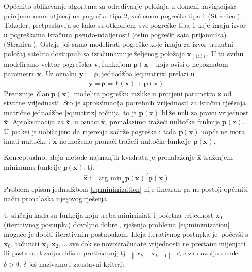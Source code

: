 \documentclass[a4paper,twoside,12pt]{memoir} %
\begin{document}
Općenito oblikovanje algoritma za određivanje položaja u domeni navigacijske primjene nema utjecaj na
pogreške tipa 2,
već samo pogreške tipa 1 (Stranica \pageref{stranica:greskaOvisisamoOxOpravdano}).
Također, pretpostavlja se kako su otklonjene sve pogreške tipa 1 koje imaju izvor 
u pogreškama izračuna pseudo-udaljenosti (osim pogreški sata prijamnika) (Stranica \pageref{stranica:greskaOvisisamoOxOpravdano}).
Ostaje još samo modelirati pogreške koje imaju za izvor trenutni položaj satelita dostupnih za
izračunavanje željenog položaja $\bar{\mathbf{x}}_{(1:3)}$.
U tu svrhu modeliramo vektor pogrešaka $\mathbf{v}$, funkcijom $\mathbf{p}(\mathbf{x})$ koja ovisi o nepoznatom parametru $\mathbf{x}$.
Uz oznaku $\mathbf{y} := \mathbf{\rho}$, 
 jednadžba  \ref{eq:matrix} prelazi u
\begin{align}\label{eq:matrix2}
\mathbf{y} = \mathbf{\rho} = \mathbf{h}(\mathbf{x})+ \mathbf{p}(\mathbf{x})
\end{align}%
Preciznije,
član $\mathbf{p}(\mathbf{x})$ modelira pogrešku razlike u procjeni parametra $\mathbf{x}$ od stvarne vrijednosti.
Što je aproksimacija potrebnih vrijednosti za izračun rješenja matrične jednadžbe
\ref{eq:matrix} točnija, to je $\mathbf{p}(\mathbf{x})$ 
bliže nuli za pravu vrijednost $\bar{\mathbf{x}}$.
Aproksimaciju za $\bar{\mathbf{x}}$, u oznaci $\hat{\mathbf{x}}$, pronalazimo tražeći nultočke funkcije $\mathbf{p}(\mathbf{x})$.
U praksi je uobičajeno da mjerenja sadrže pogreške i tada $\mathbf{p}(\mathbf{x})$ uopće ne mora imati 
nultočke i $\hat{\mathbf{x}}$ ne možemo pronaći tražeći nultočke funkcije $\mathbf{p}(\mathbf{x})$.

Konceptualno, ideja metode najmanjih kvadrata je pronalaženje $\hat{\mathbf{x}}$ traženjem minimuma
funkcije $\mathbf{p}(\mathbf{x})$, tj.
\begin{align}\label{eq:minimization}
	\hat{\mathbf{x}} := \text{arg min}_\mathbf{x} \mathbf{p}(\mathbf{x})^T\mathbf{p}(\mathbf{x})
\end{align}
Problem opisan jednadžbom \ref{eq:minimization} nije linearan pa
ne postoji općeniti način pronalaska njegovog rješenja.

U slučaju kada su funkcija koju treba minimiziati i početna vrijednost $\mathbf{x}_0$
(iterativnog postupka) dovoljno dobre 
, rješenja problema \ref{eq:minimization} moguće je
dobiti iterativnim postupakom.
Ideja iterativnog postupka je, počevši s $\mathbf{x}_0$, računati $\mathbf{x}_1, \mathbf{x}_2, \hdots $ sve dok se novoizračunate vrijednosti ne prestanu mijenjati ili postanu dovoljno bliske prethodnoj, tj.
$\left \| x_{k} - \mathbf{x}_{k-1}\right\| < \delta$ za dovoljno male $\delta > 0$.
$\delta$ još nazivamo i zaustavni kriterij.
\end{document}
